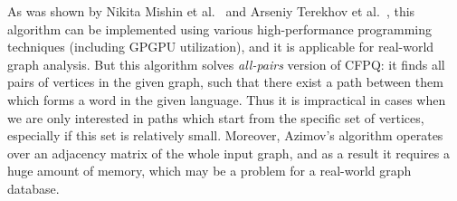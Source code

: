 As was shown by Nikita Mishin et al.~\cite{Mishin:2019:ECP:3327964.3328503} and Arseniy Terekhov et al.~\cite{ 10.1145/3398682.3399163}, this algorithm can be implemented using various high-performance programming techniques (including GPGPU utilization), and it is applicable for real-world graph analysis.
But this algorithm solves \textit{all-pairs} version of CFPQ: it finds all pairs of vertices in the given graph, such that there exist a path between them which forms a word in the given language.
Thus it is impractical in cases when we are only interested in paths which start from the specific set of vertices, especially if this set is relatively small.
Moreover, Azimov's algorithm operates over an adjacency matrix of the whole input graph, and as a result it requires a huge amount of memory, which may be a problem for a real-world graph database.


